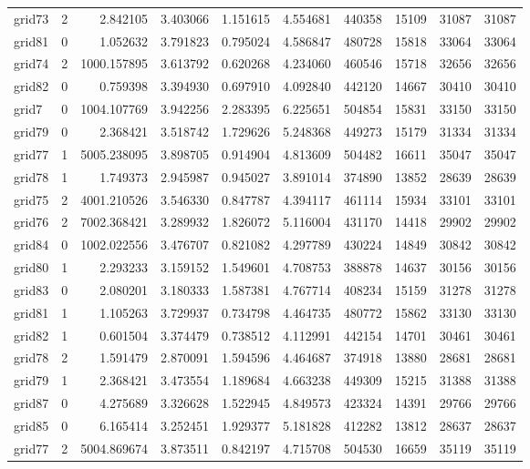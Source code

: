 \begin{longtable}{|l|r|r|r|r|r|r|r|r|r|}
grid73 & 2 & 2.842105 & 3.403066 & 1.151615 & 4.554681 & 440358 & 15109 & 31087 & 31087 \\
grid81 & 0 & 1.052632 & 3.791823 & 0.795024 & 4.586847 & 480728 & 15818 & 33064 & 33064 \\
grid74 & 2 & 1000.157895 & 3.613792 & 0.620268 & 4.234060 & 460546 & 15718 & 32656 & 32656 \\
grid82 & 0 & 0.759398 & 3.394930 & 0.697910 & 4.092840 & 442120 & 14667 & 30410 & 30410 \\
grid7 & 0 & 1004.107769 & 3.942256 & 2.283395 & 6.225651 & 504854 & 15831 & 33150 & 33150 \\
grid79 & 0 & 2.368421 & 3.518742 & 1.729626 & 5.248368 & 449273 & 15179 & 31334 & 31334 \\
grid77 & 1 & 5005.238095 & 3.898705 & 0.914904 & 4.813609 & 504482 & 16611 & 35047 & 35047 \\
grid78 & 1 & 1.749373 & 2.945987 & 0.945027 & 3.891014 & 374890 & 13852 & 28639 & 28639 \\
grid75 & 2 & 4001.210526 & 3.546330 & 0.847787 & 4.394117 & 461114 & 15934 & 33101 & 33101 \\
grid76 & 2 & 7002.368421 & 3.289932 & 1.826072 & 5.116004 & 431170 & 14418 & 29902 & 29902 \\
grid84 & 0 & 1002.022556 & 3.476707 & 0.821082 & 4.297789 & 430224 & 14849 & 30842 & 30842 \\
grid80 & 1 & 2.293233 & 3.159152 & 1.549601 & 4.708753 & 388878 & 14637 & 30156 & 30156 \\
grid83 & 0 & 2.080201 & 3.180333 & 1.587381 & 4.767714 & 408234 & 15159 & 31278 & 31278 \\
grid81 & 1 & 1.105263 & 3.729937 & 0.734798 & 4.464735 & 480772 & 15862 & 33130 & 33130 \\
grid82 & 1 & 0.601504 & 3.374479 & 0.738512 & 4.112991 & 442154 & 14701 & 30461 & 30461 \\
grid78 & 2 & 1.591479 & 2.870091 & 1.594596 & 4.464687 & 374918 & 13880 & 28681 & 28681 \\
grid79 & 1 & 2.368421 & 3.473554 & 1.189684 & 4.663238 & 449309 & 15215 & 31388 & 31388 \\
grid87 & 0 & 4.275689 & 3.326628 & 1.522945 & 4.849573 & 423324 & 14391 & 29766 & 29766 \\
grid85 & 0 & 6.165414 & 3.252451 & 1.929377 & 5.181828 & 412282 & 13812 & 28637 & 28637 \\
grid77 & 2 & 5004.869674 & 3.873511 & 0.842197 & 4.715708 & 504530 & 16659 & 35119 & 35119 \\

\end{longtable}
